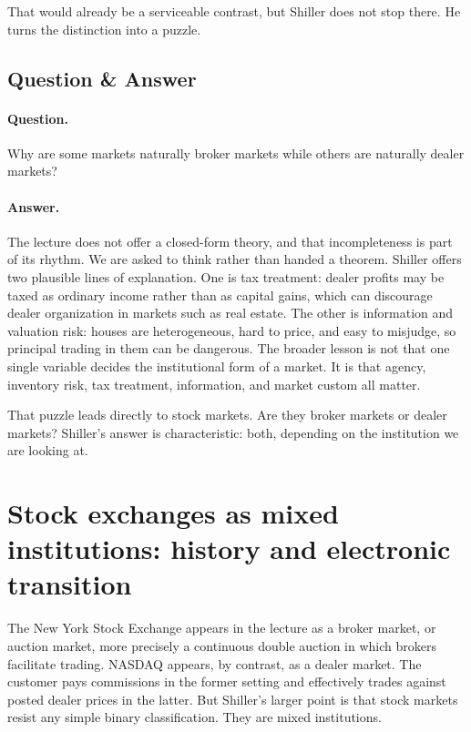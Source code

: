 That would already be a serviceable contrast, but Shiller does not stop there. He turns the distinction into a puzzle.

\subsection{Question \& Answer}

\paragraph{Question.} Why are some markets naturally broker markets while others are naturally dealer markets?

\paragraph{Answer.} The lecture does not offer a closed-form theory, and that incompleteness is part of its rhythm. We are asked to think rather than handed a theorem. Shiller offers two plausible lines of explanation. One is tax treatment: dealer profits may be taxed as ordinary income rather than as capital gains, which can discourage dealer organization in markets such as real estate. The other is information and valuation risk: houses are heterogeneous, hard to price, and easy to misjudge, so principal trading in them can be dangerous. The broader lesson is not that one single variable decides the institutional form of a market. It is that agency, inventory risk, tax treatment, information, and market custom all matter.

That puzzle leads directly to stock markets. Are they broker markets or dealer markets? Shiller's answer is characteristic: both, depending on the institution we are looking at.

\section{Stock exchanges as mixed institutions: history and electronic transition}

The New York Stock Exchange appears in the lecture as a broker market, or auction market, more precisely a continuous double auction in which brokers facilitate trading. NASDAQ appears, by contrast, as a dealer market. The customer pays commissions in the former setting and effectively trades against posted dealer prices in the latter. But Shiller's larger point is that stock markets resist any simple binary classification. They are mixed institutions.

